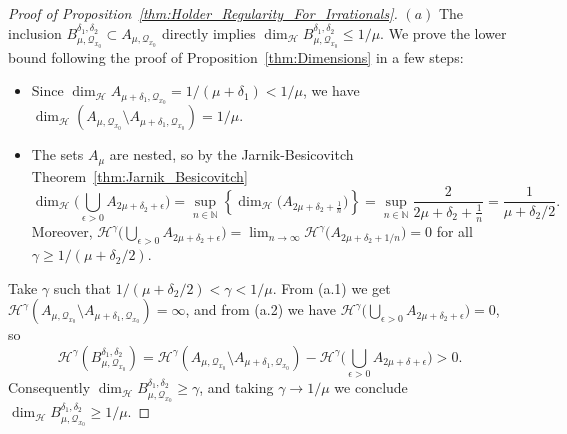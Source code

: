 \documentclass[11pt,reqno]{amsart}
\theoremstyle{definition}
\begin{document}
\begin{proof}[Proof of Proposition~\ref{thm:Holder_Regularity_For_Irrationals}]
$(a)$  
The inclusion $B^{\delta_1, \delta_2}_{\mu, \mathcal Q_{x_0}} \subset A_{\mu, \mathcal Q_{x_0}}$ directly implies 
$ \operatorname{dim}_{\mathcal H} B^{\delta_1, \delta_2}_{\mu, \mathcal Q_{x_0}} \leq 1/\mu$. 
We prove the lower bound following the proof of Proposition~\ref{thm:Dimensions} in a few steps:
\begin{itemize}
	
	\item[(a.1)] Since $\operatorname{dim}_{\mathcal H}  A_{\mu + \delta_1, \mathcal Q_{x_0} } = 1/(\mu + \delta_1) < 1/\mu$, 
	we have $\operatorname{dim}_{\mathcal H}  ( A_{\mu, \mathcal Q_{x_0}} \setminus A_{\mu + \delta_1, \mathcal Q_{x_0} } ) = 1/\mu$. 
	

	\item[(a.2)] The sets $A_\mu$ are nested, 
so by the Jarnik-Besicovitch Theorem~\ref{thm:Jarnik_Besicovitch}
\begin{equation}\label{eq:Dimension_With_Delta}
\operatorname{dim}_{\mathcal H}  \Big(\bigcup_{\epsilon > 0} A_{2\mu + \delta_2 + \epsilon} \Big)
= \sup_{n \in \mathbb N} \left\{ \operatorname{dim}_{\mathcal H} \Big( A_{2\mu + \delta_2 + \frac{1}{n}}  \Big) \right\}
= \sup_{n \in \mathbb N}  \frac{2}{2\mu + \delta_2 + \frac{1}{n}} 
= \frac{1}{\mu + \delta_2 / 2}. 
\end{equation}
Moreover, 
$\mathcal H^\gamma  \big(\bigcup_{\epsilon > 0} A_{2\mu + \delta_2 + \epsilon} \big) 
= \lim_{n  \to \infty} \mathcal H^\gamma \big( A_{2\mu + \delta_2 + 1/n} \big) = 0$ for all $\gamma \geq 1/(\mu + \delta_2/2)$.  



\end{itemize}
Take $\gamma$ such that 
$1/ (\mu + \delta_2 /2) < \gamma < 1/\mu$. 
From (a.1)
we get $\mathcal H^{\gamma}  ( A_{\mu, \mathcal Q_{x_0}} \setminus A_{\mu + \delta_1, \mathcal Q_{x_0} } ) = \infty$, 
and from (a.2) we have 
$\mathcal H^{\gamma} \big(\bigcup_{\epsilon > 0} A_{2\mu + \delta_2 + \epsilon} \big) = 0 $,  
so
\begin{equation}
\mathcal H^\gamma (B^{\delta_1, \delta_2}_{\mu, \mathcal Q_{x_0}})
= \mathcal H^\gamma  ( A_{\mu, \mathcal Q_{x_0}} \setminus A_{\mu + \delta_1, \mathcal Q_{x_0} } )- \mathcal H^\gamma \Big(\bigcup_{\epsilon > 0} A_{2\mu + \delta  + \epsilon} \Big) > 0.
\end{equation}
Consequently $\operatorname{dim}_{\mathcal H} B^{\delta_1,\delta_2}_{\mu, \mathcal Q_{x_0}} \geq \gamma$,
and taking $\gamma \to 1/\mu$ we conclude  $\operatorname{dim}_{\mathcal H} B^{\delta_1,\delta_2}_{\mu, \mathcal Q_{x_0}} \geq 1/\mu$.
	

\end{proof}
\end{document}
